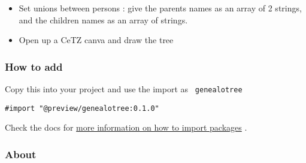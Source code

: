 \begin{itemize}
\tightlist
\item
  Set unions between persons : give the parents names as an array of 2
  strings, and the children names as an array of strings.
\end{itemize}

\begin{Shaded}
\begin{Highlighting}[]
\NormalTok{)}
\end{Highlighting}
\end{Shaded}

\begin{itemize}
\tightlist
\item
  Open up a CeTZ canva and draw the tree
\end{itemize}

\begin{Shaded}
\begin{Highlighting}[]
\NormalTok{\})}
\end{Highlighting}
\end{Shaded}

\subsubsection{How to add}\label{how-to-add}

Copy this into your project and use the import as
\texttt{\ genealotree\ }

\begin{verbatim}
#import "@preview/genealotree:0.1.0"
\end{verbatim}



Check the docs for
\href{https://typst.app/docs/reference/scripting/\#packages}{more
information on how to import packages} .

\subsubsection{About}\label{about}


